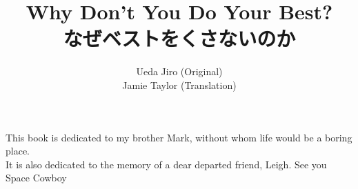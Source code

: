 \documentclass[11pt, a4paper, twoside]{report}	%
\newenvironment{dedication}  
{  
   \thispagestyle{empty}  
   \vspace*{\stretch{1}}  
   \hfill\begin{minipage}[t]{0.66\textwidth}  
   \raggedright  
}%
{  
   \end{minipage}  
   \vspace*{\stretch{3}}  
   \clearpage  
}
\begin{document}
\begin{CJK}{UTF8}{min}				%


\renewcommand\rubysep{-0.1ex}

\pagestyle{empty}

\begin{dedication}  
This book is dedicated to my brother Mark, without whom life would be a boring place.
\\It is also dedicated to the memory of a dear departed friend, Leigh. See you Space Cowboy
\end{dedication}


\title{Why Don't You Do Your Best?\\なぜベストをくさないのか}
\author{Ueda Jiro (Original)\\Jamie Taylor (Translation)}
\maketitle







\end{CJK}
\end{document}
